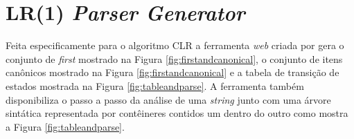 \begin{figure}[ht]
    \captionsetup{width=16cm}
\end{figure}

\section{LR(1) \textit{Parser Generator}}
Feita especificamente para o algoritmo CLR a ferramenta \textit{web} criada por \textcite{LR-2024-04-12} gera o conjunto de \textit{first} mostrado na Figura \ref{fig:firstandcanonical}, o conjunto de itens canônicos mostrado na Figura \ref{fig:firstandcanonical} e a tabela de transição de estados mostrada na Figura \ref{fig:tableandparse}. A ferramenta também disponibiliza o passo a passo da análise de uma \textit{string} junto com uma árvore sintática representada por contêineres contidos um dentro do outro como mostra a Figura \ref{fig:tableandparse}.

